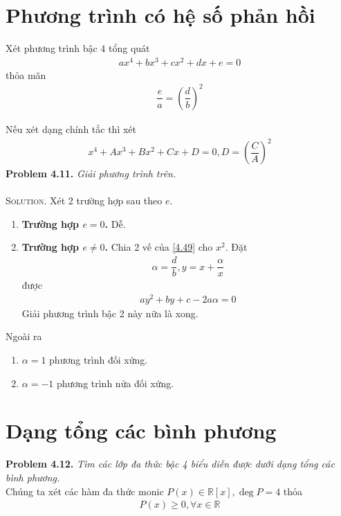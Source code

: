 \documentclass[a4paper,oneside]{book}
\numberwithin{equation}{chapter}
\begin{document}
\section{Phương trình có hệ số phản hồi}
Xét phương trình bậc 4 tổng quát 
\begin{align}
\label{4.49}
a{x^4} + b{x^3} + c{x^2} + dx + e = 0
\end{align}
thỏa mãn 
\begin{align}
\dfrac{e}{a} = {\left( {\dfrac{d}{b}} \right)^2}
\end{align}

Nếu xét dạng chính tắc thì xét
\begin{align}
{x^4} + A{x^3} + B{x^2} + Cx + D = 0,D = {\left( {\dfrac{C}{A}} \right)^2}
\end{align}
\textbf{Problem 4.11.} \textit{Giải phương trình trên.}\\
\\
\textsc{Solution.} Xét 2 trường hợp sau theo $e$.
\begin{enumerate}
\item \textbf{Trường hợp $e=0$.} Dễ.
\item \textbf{Trường hợp $e \ne 0$.} Chia 2 vế của \eqref{4.49} cho ${x^2}$. Đặt 
\begin{align}
\alpha  = \dfrac{d}{b},y = x + \dfrac{\alpha }{x}
\end{align}
được
\begin{align}
a{y^2} + by + c - 2a\alpha  = 0
\end{align}
Giải phương trình bậc 2 này nữa là xong.
\end{enumerate}
Ngoài ra
\begin{enumerate}
\item $\alpha  = 1$ phương trình đối xứng.
\item $\alpha  = -1$ phương trình nửa đối xứng.
\end{enumerate}
\section{Dạng tổng các bình phương}
\textbf{Problem 4.12.} \textit{Tìm các lớp đa thức bậc 4 biểu diễn được dưới dạng tổng các bình phương.}\\

Chúng ta xét các hàm đa thức monic $P\left( x \right) \in \mathbb{R}\left[ x \right],\deg P = 4$ thỏa
\begin{align}
P\left( x \right) \ge 0,\forall x \in \mathbb{R}
\end{align}
\end{document}
